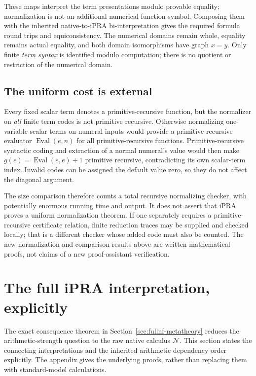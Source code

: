 \documentclass[11pt,letterpaper]{article}
\theoremstyle{definition}
\theoremstyle{remark}
\begin{document}
These maps interpret the term presentations modulo provable equality;
normalization is not an additional numerical function symbol.  Composing
them with the inherited native-to-iPRA bi-interpretation gives the required
formula round trips and equiconsistency.  The numerical domains remain
whole, equality remains actual equality, and both domain isomorphisms have
graph $x=y$.  Only finite \emph{term syntax} is identified modulo computation;
there is no quotient or restriction of the numerical domain.

\subsection{The uniform cost is external}

Every fixed scalar term denotes a primitive-recursive function, but the
normalizer on \emph{all} finite term codes is not primitive recursive.
Otherwise normalizing one-variable scalar terms on numeral inputs would
provide a primitive-recursive evaluator $\operatorname{Eval}(e,n)$ for
all primitive-recursive functions.  Primitive-recursive syntactic coding
and extraction of a normal numeral's value would then make
$g(e)=\operatorname{Eval}(e,e)+1$ primitive recursive, contradicting its
own scalar-term index.  Invalid codes can be assigned the default value
zero, so they do not affect the diagonal argument.

The size comparison therefore counts a total recursive normalizing checker,
with potentially enormous running time and output.  It does not assert
that iPRA proves a uniform normalization theorem.  If one separately
requires a primitive-recursive certificate relation, finite reduction
traces may be supplied and checked locally; that is a different checker
whose added code must also be counted.  The new normalization and comparison
results above are written mathematical proofs, not claims of a new
proof-assistant verification.

\section{The full iPRA interpretation, explicitly}
\label{sec:interpretations}

The exact consequence theorem in Section~\ref{sec:fullnf-metatheory}
reduces the arithmetic-strength question to the raw native calculus
$\mathcal N$. This section states the connecting interpretations and
the inherited arithmetic dependency order explicitly. The appendix gives
the underlying proofs, rather than replacing them with standard-model
calculations.
\end{document}
